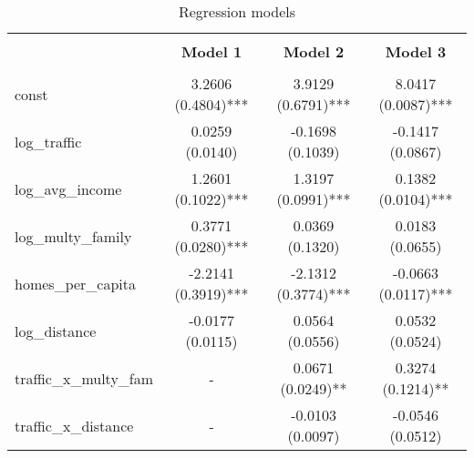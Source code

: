 
    \begin{table}
        \centering
        \caption{Regression models}
        \vspace{10pt}
        \label{tab:regression_models}
        \begin{tabular}{lccc}
        \hline
        \hline \\[-1.8ex]
     & \textbf{Model 1} & \textbf{Model 2} & \textbf{Model 3} \\
\hline \\[-1.8ex] 
const & 3.2606 (0.4804)*** & 3.9129 (0.6791)*** & 8.0417 (0.0087)*** \\
log\_traffic & 0.0259 (0.0140) & -0.1698 (0.1039) & -0.1417 (0.0867) \\
log\_avg\_income & 1.2601 (0.1022)*** & 1.3197 (0.0991)*** & 0.1382 (0.0104)*** \\
log\_multy\_family & 0.3771 (0.0280)*** & 0.0369 (0.1320) & 0.0183 (0.0655) \\
homes\_per\_capita & -2.2141 (0.3919)*** & -2.1312 (0.3774)*** & -0.0663 (0.0117)*** \\
log\_distance & -0.0177 (0.0115) & 0.0564 (0.0556) & 0.0532 (0.0524) \\
traffic\_x\_multy\_fam & - & 0.0671 (0.0249)** & 0.3274 (0.1214)** \\
traffic\_x\_distance & - & -0.0103 (0.0097) & -0.0546 (0.0512) \\

        \hline
        \hline
        \end{tabular}
    \end{table}
    